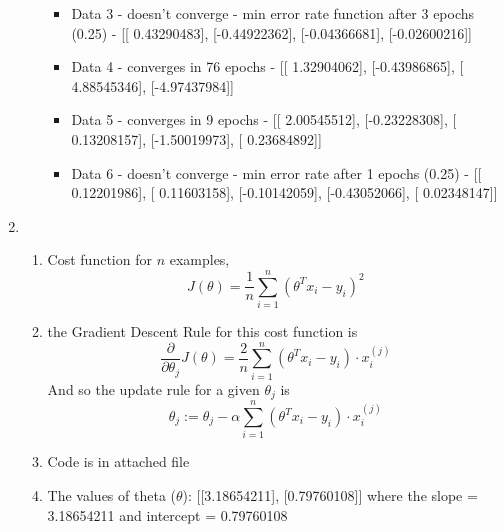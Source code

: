 \documentclass[a4paper]{article}
\begin{document}
\begin{enumerate}
\begin{enumerate}
\begin{itemize}
		\item Data 3 - doesn't converge - min error rate function after 3 epochs (0.25) - [[ 0.43290483], [-0.44922362], [-0.04366681], [-0.02600216]]
		\item Data 4 - converges in 76 epochs - [[ 1.32904062], [-0.43986865], [ 4.88545346], [-4.97437984]]
		\item Data 5 - converges in 9 epochs - [[ 2.00545512], [-0.23228308], [ 0.13208157], [-1.50019973], [ 0.23684892]]
		\item Data 6 - doesn't converge - min error rate after 1 epochs (0.25) - [[ 0.12201986], [ 0.11603158], [-0.10142059], [-0.43052066], [ 0.02348147]]\\
	\end{itemize}
	\end{enumerate}
	\item 
	\begin{enumerate}
	\item Cost function for $n$ examples, 
	\begin{equation*}
		\boxed{J(\theta) = \frac{1}{n} \sum_{i=1}^n (\theta^Tx_i - y_i)^2}
	\end{equation*}
	\item the Gradient Descent Rule for this cost function is
	\begin{equation*}
		\frac{\partial}{\partial \theta_j} J(\theta) = \frac{2}{n} \sum_{i=1}^n (\theta^Tx_i - y_i) \cdot x_i^{(j)} 
	\end{equation*}
	And so the update rule for a given $\theta_j$ is
	\begin{equation*}
		\theta_j := \theta_j - \alpha \sum_{i=1}^n (\theta^Tx_i - y_i) \cdot x_i^{(j)}
	\end{equation*}
	
	\item Code is in attached file
	\item 
	The values of theta ($\theta$): [[3.18654211], [0.79760108]] where the slope = 3.18654211 and intercept = 0.79760108
	\end{enumerate}
\end{enumerate}
\end{document}
